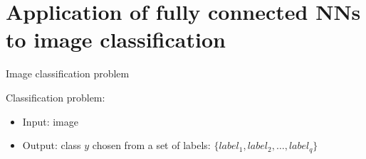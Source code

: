 \documentclass[xcolor=pdftex,dvipsnames,table,mathserif]{beamer}
\begin{document}
\section{Application of fully connected NNs to image classification}





\begin{frame}{Image classification problem}

  Classification problem:
  \begin{itemize}
  \item Input: image
  \item Output: class $y$ chosen from a set of labels: $\{ label_1, label_2, \ldots, label_q\}$
  \end{itemize}


\end{frame}

\end{document}

